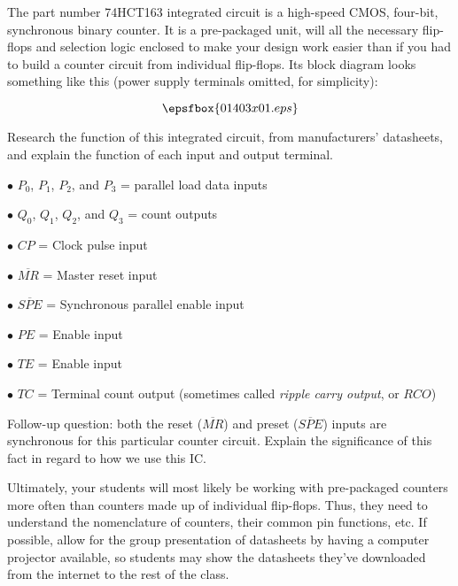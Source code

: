 

The part number 74HCT163 integrated circuit is a high-speed CMOS, four-bit, synchronous binary counter.  It is a pre-packaged unit, will all the necessary flip-flops and selection logic enclosed to make your design work easier than if you had to build a counter circuit from individual flip-flops.  Its block diagram looks something like this (power supply terminals omitted, for simplicity):

$$\epsfbox{01403x01.eps}$$

Research the function of this integrated circuit, from manufacturers' datasheets, and explain the function of each input and output terminal.







\medskip
\item{$\bullet$} $P_0$, $P_1$, $P_2$, and $P_3$ = parallel load data inputs
\item{$\bullet$} $Q_0$, $Q_1$, $Q_2$, and $Q_3$ = count outputs
\item{$\bullet$} $CP$ = Clock pulse input
\item{$\bullet$} $\overline{MR}$ = Master reset input
\item{$\bullet$} $\overline{SPE}$ = Synchronous parallel enable input
\item{$\bullet$} $PE$ = Enable input
\item{$\bullet$} $TE$ = Enable input
\item{$\bullet$} $TC$ = Terminal count output (sometimes called {\it ripple carry output}, or $RCO$)
\medskip

\vskip 10pt

Follow-up question: both the reset ($\overline{MR}$) and preset ($\overline{SPE}$) inputs are synchronous for this particular counter circuit.  Explain the significance of this fact in regard to how we use this IC.







Ultimately, your students will most likely be working with pre-packaged counters more often than counters made up of individual flip-flops.  Thus, they need to understand the nomenclature of counters, their common pin functions, etc.  If possible, allow for the group presentation of datasheets by having a computer projector available, so students may show the datasheets they've downloaded from the internet to the rest of the class.

